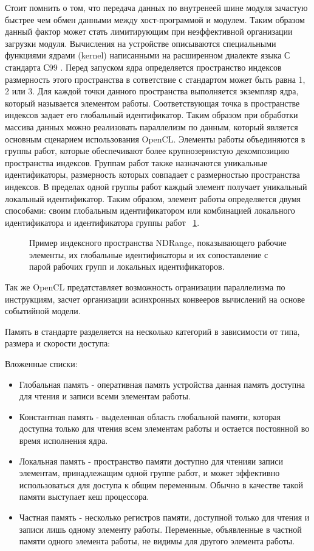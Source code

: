 Стоит помнить о том, что передача данных по внутренеей шине модуля зачастую быстрее чем обмен данными между хост-программой и модулем. Таким образом данный фактор может стать лимитирующим при неэффективной организации загрузки модуля. Вычисления на устройстве описываются специальными функциями ядрами (kernel) написанными на расширенном диалекте языка С стандарта С99 \cite{Kernighan1988, ISO:C99}. Перед запуском ядра определяется пространство индексов размерность этого пространства в сответствие с стандартом может быть равна 1, 2 или 3. Для каждой точки данного пространства выполняется экземпляр ядра, который называется элементом работы. Соответствующая точка в пространстве индексов задает его глобальный идентификатор. Таким образом при обработки массива данных можно реализовать параллелизм по данным, который является основным сценарием использования OpenCL. Элементы работы объединяются в группы работ, которые обеспечивают более крупнозернистую  декомпозицию пространства индексов. Группам работ также назначаются уникальные идентификаторы, размерность которых совпадает с размерностью пространства индексов. В пределах  одной группы работ каждый элемент получает уникальный локальный идентификатор. Таким образом, элемент работы определяется двумя способами: своим глобальным идентификатором или комбинацией локального идентификатора и идентификатора группы работ ~\ref{fig:ndrange}.
\begin{figure}[ht]
  \caption{Пример индексного пространства NDRange, показывающего рабочие элементы, их глобальные идентификаторы и их сопоставление с парой рабочих групп и локальных идентификаторов.}\label{fig:ndrange}
\end{figure}
Так же OpenCL предатставляет возможность огранизации параллелизма по инструкциям, засчет организации асинхронных конвееров вычислений на основе событийной модели.

Память в стандарте разделяется на несколько категорий в зависимости от типа, размера и скорости доступа:

\noindent Вложенные списки:
\begin{itemize}
  \item Глобальная память - оперативная память устройства данная память доступна для чтения и записи всеми элементам работы.
  \item Константная память - выделенная область  глобальной  памяти, которая  доступна только для чтения всем элементам работы и остается постоянной во время исполнения ядра.
  \item Локальная память - пространство памяти доступно для чтенияи записи элементам, принадлежащим одной группе работ, и может эффективно использоваться для доступа к общим переменным. Обычно в качестве такой памяти выступает кеш процессора.
  \item Частная память - несколько регистров памяти, доступной только для чтения и записи лишь одному элементу работы. Переменные, объявленные в частной памяти одного элемента работы, не видимы для другого элемента работы.
\end{itemize}


